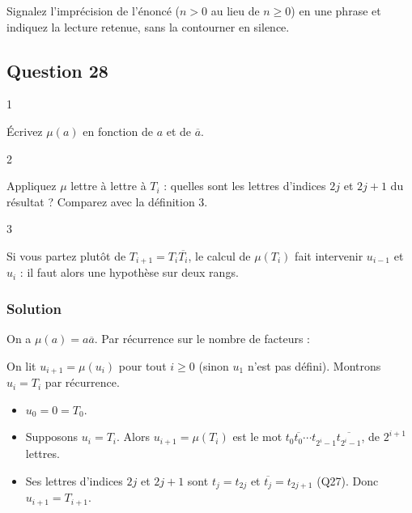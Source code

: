 \documentclass[11pt,a4paper]{article}
\providecommand{\tightlist}{\setlength{\itemsep}{0pt}\setlength{\parskip}{0pt}}
\newcommand{\equationajustee}[1]{%
  \sbox{\boiteequation}{$\displaystyle #1$}%
  \ifdim\wd\boiteequation>\linewidth
    \[\resizebox{\linewidth}{!}{\usebox{\boiteequation}}\]%
  \else
    \[#1\]%
  \fi}
\begin{document}
\begin{piege}

Signalez l'imprécision de l'énoncé (\(n>0\) au lieu de \(n\ge 0\)) en une phrase et indiquez la lecture retenue, sans la contourner en silence.

\end{piege}

\hypertarget{question-28}{%
\subsection{Question 28}\label{question-28}}

\begin{indication}{1}

Écrivez \(\mu(a)\) en fonction de \(a\) et de \(\overline a\).

\end{indication}

\begin{indication}{2}

Appliquez \(\mu\) lettre à lettre à \(T_i\) : quelles sont les lettres d'indices \(2j\) et \(2j+1\) du résultat ? Comparez avec la définition 3.

\end{indication}

\begin{indication}{3}

Si vous partez plutôt de \(T_{i+1}=T_i\overline{T_i}\), le calcul de \(\mu(T_i)\) fait intervenir \(u_{i-1}\) et \(u_i\) : il faut alors une hypothèse sur deux rangs.

\end{indication}

\hypertarget{solution-27}{%
\subsubsection{Solution}\label{solution-27}}

On a \(\mu(a)=a\overline a\). Par récurrence sur le nombre de facteurs :

\equationajustee{\mu(a_0\cdots a_{p-1})=\mu(a_0)\cdots\mu(a_{p-1}).}

On lit \(u_{i+1}=\mu(u_i)\) pour tout \(i\ge 0\) (sinon \(u_1\) n'est pas défini). Montrons \(u_i=T_i\) par récurrence.

\begin{itemize}
\tightlist
\item
  \(u_0=0=T_0\).
\item
  Supposons \(u_i=T_i\). Alors \(u_{i+1}=\mu(T_i)\) est le mot \(t_0\overline{t_0}\cdots t_{2^i-1}\overline{t_{2^i-1}}\), de \(2^{i+1}\) lettres.
\item
  Ses lettres d'indices \(2j\) et \(2j+1\) sont \(t_j=t_{2j}\) et \(\overline{t_j}=t_{2j+1}\) (Q27). Donc \(u_{i+1}=T_{i+1}\).
\end{itemize}
\end{document}
